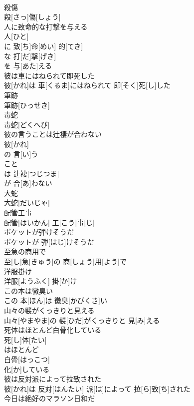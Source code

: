 \documentclass[8pt]{extreport}
\begin{document}
\begin{CJK}{UTF8}{min}
\\	殺傷	
\\	殺[さっ]傷[しょう]
\\	人に致命的な打撃を与える	
\\	人[ひと]
\\	に 致[ち]命[めい] 的[てき]
\\	な 打[だ]撃[げき]
\\	を 与[あた]える 
\\	彼は車にはねられて即死した	
\\	彼[かれ]は 車[くるま]にはねられて 即[そく]死[し]した
\\	筆跡	
\\	筆跡[ひっせき]
\\	毒蛇	
\\	毒蛇[どくへび]
\\	彼の言うことは辻褄が合わない	
\\	彼[かれ]
\\	の 言[い]う 
\\	こと 
\\	は 辻褄[つじつま]
\\	が 合[あ]わない 
\\	大蛇	
\\	大蛇[だいじゃ]
\\	配管工事	
\\	配管[はいかん] 工[こう]事[じ]
\\	ポケットが弾けそうだ	
\\	ポケットが 弾[はじ]けそうだ
\\	至急の商用で	
\\	至[し]急[きゅう]の 商[しょう]用[よう]で
\\	洋服掛け	
\\	洋服[ようふく] 掛[か]け
\\	この本は黴臭い	
\\	この 本[ほん]は 黴臭[かびくさ]い
\\	山々の襞がくっきりと見える	
\\	山々[やまやま]の 襞[ひだ]がくっきりと 見[み]える
\\	死体はほとんど白骨化している	
\\	死[し]体[たい]
\\	はほとんど 
\\	白骨[はっこつ]
\\	化[か]している
\\	彼は反対派によって拉致された	
\\	彼[かれ]は 反対[はんたい] 派[は]によって 拉[ら]致[ち]された
\\	今日は絶好のマラソン日和だ	

\end{CJK}
\end{document}
